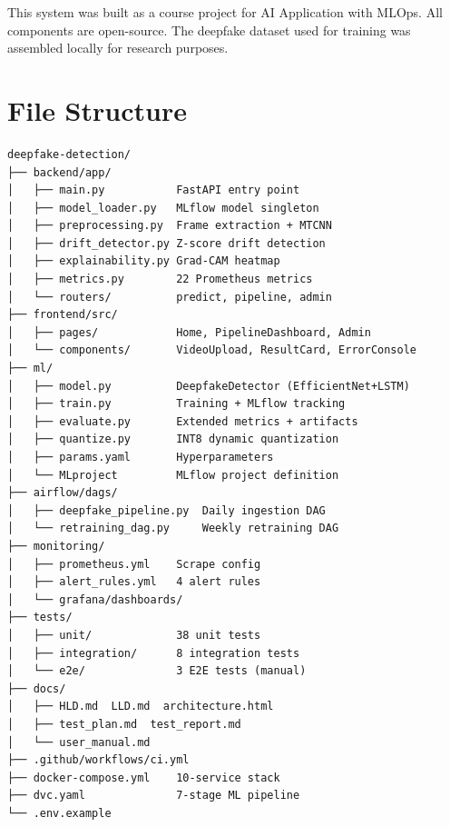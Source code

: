 \documentclass[conference]{IEEEtran}
\begin{document}
This system was built as a course project for AI Application with MLOps. All components are open-source. The deepfake dataset used for training was assembled locally for research purposes.

\appendix
\section{File Structure}

\begin{lstlisting}[caption={Project Directory Structure}]
deepfake-detection/
├── backend/app/
│   ├── main.py           FastAPI entry point
│   ├── model_loader.py   MLflow model singleton
│   ├── preprocessing.py  Frame extraction + MTCNN
│   ├── drift_detector.py Z-score drift detection
│   ├── explainability.py Grad-CAM heatmap
│   ├── metrics.py        22 Prometheus metrics
│   └── routers/          predict, pipeline, admin
├── frontend/src/
│   ├── pages/            Home, PipelineDashboard, Admin
│   └── components/       VideoUpload, ResultCard, ErrorConsole
├── ml/
│   ├── model.py          DeepfakeDetector (EfficientNet+LSTM)
│   ├── train.py          Training + MLflow tracking
│   ├── evaluate.py       Extended metrics + artifacts
│   ├── quantize.py       INT8 dynamic quantization
│   ├── params.yaml       Hyperparameters
│   └── MLproject         MLflow project definition
├── airflow/dags/
│   ├── deepfake_pipeline.py  Daily ingestion DAG
│   └── retraining_dag.py     Weekly retraining DAG
├── monitoring/
│   ├── prometheus.yml    Scrape config
│   ├── alert_rules.yml   4 alert rules
│   └── grafana/dashboards/
├── tests/
│   ├── unit/             38 unit tests
│   ├── integration/      8 integration tests
│   └── e2e/              3 E2E tests (manual)
├── docs/
│   ├── HLD.md  LLD.md  architecture.html
│   ├── test_plan.md  test_report.md
│   └── user_manual.md
├── .github/workflows/ci.yml
├── docker-compose.yml    10-service stack
├── dvc.yaml              7-stage ML pipeline
└── .env.example
\end{lstlisting}
\end{document}
